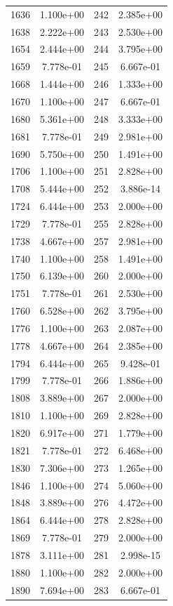 \documentclass[12pt]{article}
\begin{document}
\begin{longtable}{@{}cccc@{}}
1636 & 1.100e+00 & 242 & 2.385e+00 \\
1638 & 2.222e+00 & 243 & 2.530e+00 \\
1654 & 2.444e+00 & 244 & 3.795e+00 \\
1659 & 7.778e-01 & 245 & 6.667e-01 \\
1668 & 1.444e+00 & 246 & 1.333e+00 \\
1670 & 1.100e+00 & 247 & 6.667e-01 \\
1680 & 5.361e+00 & 248 & 3.333e+00 \\
1681 & 7.778e-01 & 249 & 2.981e+00 \\
1690 & 5.750e+00 & 250 & 1.491e+00 \\
1706 & 1.100e+00 & 251 & 2.828e+00 \\
1708 & 5.444e+00 & 252 & 3.886e-14 \\
1724 & 6.444e+00 & 253 & 2.000e+00 \\
1729 & 7.778e-01 & 255 & 2.828e+00 \\
1738 & 4.667e+00 & 257 & 2.981e+00 \\
1740 & 1.100e+00 & 258 & 1.491e+00 \\
1750 & 6.139e+00 & 260 & 2.000e+00 \\
1751 & 7.778e-01 & 261 & 2.530e+00 \\
1760 & 6.528e+00 & 262 & 3.795e+00 \\
1776 & 1.100e+00 & 263 & 2.087e+00 \\
1778 & 4.667e+00 & 264 & 2.385e+00 \\
1794 & 6.444e+00 & 265 & 9.428e-01 \\
1799 & 7.778e-01 & 266 & 1.886e+00 \\
1808 & 3.889e+00 & 267 & 2.000e+00 \\
1810 & 1.100e+00 & 269 & 2.828e+00 \\
1820 & 6.917e+00 & 271 & 1.779e+00 \\
1821 & 7.778e-01 & 272 & 6.468e+00 \\
1830 & 7.306e+00 & 273 & 1.265e+00 \\
1846 & 1.100e+00 & 274 & 5.060e+00 \\
1848 & 3.889e+00 & 276 & 4.472e+00 \\
1864 & 6.444e+00 & 278 & 2.828e+00 \\
1869 & 7.778e-01 & 279 & 2.000e+00 \\
1878 & 3.111e+00 & 281 & 2.998e-15 \\
1880 & 1.100e+00 & 282 & 2.000e+00 \\
1890 & 7.694e+00 & 283 & 6.667e-01 \\

\end{longtable}
\end{document}
